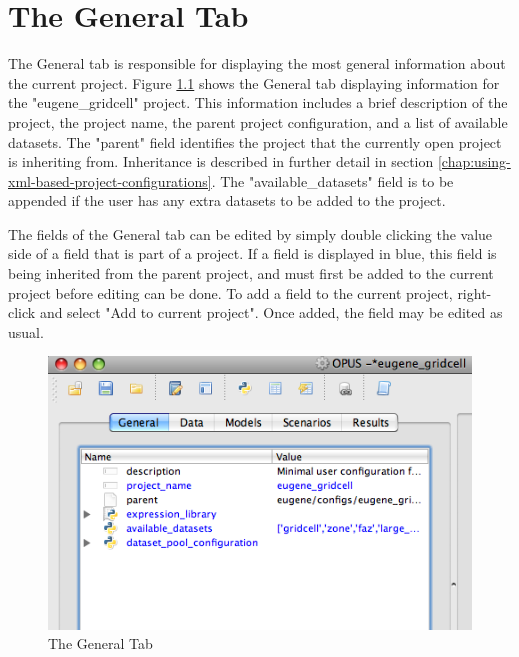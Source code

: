 \chapter{The General Tab}

The General tab is responsible for displaying the most general information about the current project.  Figure \ref{fig:general} shows the General tab displaying information for the "eugene\_gridcell" project.  This information includes a brief description of the project, the project name, the parent project configuration, and a list of available datasets.  The "parent" field identifies the project that the currently open project is inheriting from.  Inheritance is described in further detail in section \ref{chap:using-xml-based-project-configurations}.  The "available\_datasets" field is to be appended if the user has any extra datasets to be added to the project.

The fields of the General tab can be edited by simply double clicking the value side of a field that is part of a project.  If a field is displayed in blue, this field is being inherited from the parent project, and must first be added to the current project before editing can be done. To add a field to the current project, right-click and select "Add to current project".  Once added, the field may be edited as usual.

\begin{figure}[htp]
\begin{center}
\includegraphics[scale=0.6]{part-gui/images/general-tab.png}
\end{center}
\caption{The General Tab}
\label{fig:general}
\end{figure}

